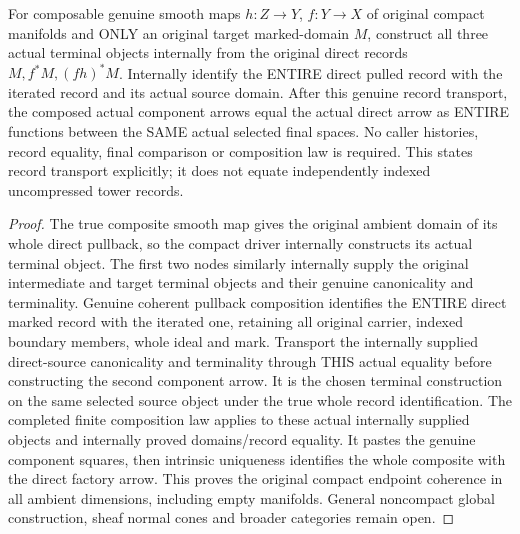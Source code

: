 \begin{theorem}
\label{hir:smooth-original-compact-terminal-arrow-composition}
\leanok
{}
For composable genuine smooth maps $h:Z\to Y$, $f:Y\to X$ of original
compact manifolds and ONLY an original target marked-domain $M$, construct
all three actual terminal objects internally from the original direct records
$M,f^*M,(fh)^*M$. Internally identify the ENTIRE direct pulled record with
the iterated record and its actual source domain. After this genuine record
transport, the composed actual component arrows equal the actual direct
arrow as ENTIRE functions between the SAME actual selected final spaces.
No caller histories, record equality, final comparison or composition law
is required. This states record transport explicitly; it does not equate
independently indexed uncompressed tower records.
\end{theorem}
\begin{proof}
The true composite smooth map gives the original ambient domain of its
whole direct pullback, so the compact driver internally constructs its
actual terminal object. The first two nodes similarly internally supply
the original intermediate and target terminal objects and their genuine
canonicality and terminality. Genuine coherent pullback composition
identifies the ENTIRE direct marked record with the iterated one, retaining
all original carrier, indexed boundary members, whole ideal and mark.
Transport the internally supplied direct-source canonicality and terminality
through THIS actual equality before constructing the second component arrow.
It is the chosen terminal construction on the same selected source object
under the true whole record identification. The completed finite composition
law applies to these actual internally supplied objects and internally
proved domains/record equality. It pastes the genuine component squares,
then intrinsic uniqueness identifies the whole composite with the direct
factory arrow. This proves the original compact endpoint coherence in all
ambient dimensions, including empty manifolds. General noncompact global
construction, sheaf normal cones and broader categories remain open.
\end{proof}
